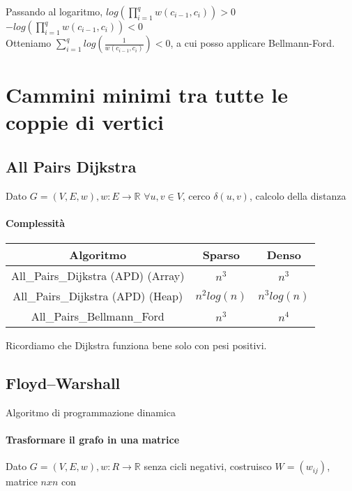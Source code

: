 Passando al logaritmo, $log(\prod_{i=1}^q{w(c_{i-1},c_i)}) > 0$ \\
$-log(\prod_{i=1}^q{w(c_{i-1},c_i)}) < 0$ \\
Otteniamo $\sum_{i=1}^q{log(\frac{1}{w(c_{i-1},c_i)})} < 0$, a cui posso applicare Bellmann-Ford.

\section{Cammini minimi tra tutte le coppie di vertici}

\subsection{All Pairs Dijkstra}

Dato $G=(V,E,w), w: E \rightarrow \mathbb{R}$
$\forall u,v \in V$, cerco $\delta(u,v)$, calcolo della distanza



\paragraph{Complessità}

\begin{tabular}{|c|c|c|}
\hline
Algoritmo & Sparso & Denso \\
\hline
All\_Pairs\_Dijkstra (APD) (Array) & $n^3$ & $n^3$ \\
\hline
All\_Pairs\_Dijkstra (APD) (Heap) & $n^2log(n)$ & $n^3log(n)$ \\
\hline
All\_Pairs\_Bellmann\_Ford & $n^3$ & $n^4$ \\
\hline
\end{tabular}

Ricordiamo che Dijkstra funziona bene solo con pesi positivi.

\subsection{Floyd–Warshall}

Algoritmo di programmazione dinamica

\paragraph{Trasformare il grafo in una matrice}

Dato $G=(V,E,w), w : R \rightarrow \mathbb{R}$ senza cicli negativi, costruisco $W=(w_{ij})$, matrice $nxn$ con

